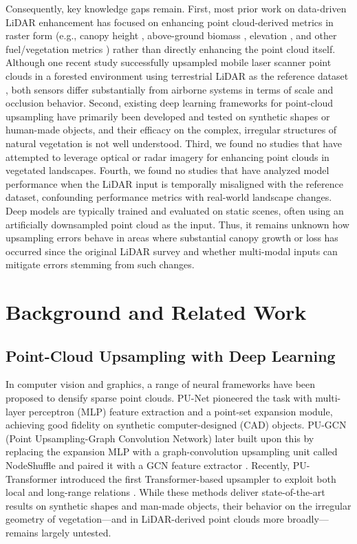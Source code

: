 \documentclass[12pt]{report}
\begin{document}
Consequently, key knowledge gaps remain. First, most prior work on data-driven LiDAR enhancement has focused on enhancing point cloud-derived metrics in raster form (e.g., canopy height \cite{wilkes_mapping_2015, wagner_sub-meter_2024}, above-ground biomass \cite{shendryk2022fusing}, elevation \cite{li2023large}, and other fuel/vegetation metrics \cite{taneja2023up, gazzea2023high}) rather than directly enhancing the point cloud itself. Although one recent study successfully upsampled mobile laser scanner point clouds in a forested environment using terrestrial LiDAR as the reference dataset \cite{remijnse2024upsampling}, both sensors differ substantially from airborne systems in terms of scale and occlusion behavior. Second, existing deep learning frameworks for point-cloud upsampling have primarily been developed and tested on synthetic shapes or human-made objects, and their efficacy on the complex, irregular structures of natural vegetation is not well understood. Third, we found no studies that have attempted to leverage optical or radar imagery for enhancing point clouds in vegetated landscapes. Fourth, we found no studies that have analyzed model performance when the LiDAR input is temporally misaligned with the reference dataset, confounding performance metrics with real-world landscape changes. Deep models are typically trained and evaluated on static scenes, often using an artificially downsampled point cloud as the input. Thus, it remains unknown how upsampling errors behave in areas where substantial canopy growth or loss has occurred since the original LiDAR survey and whether multi-modal inputs can mitigate errors stemming from such changes.

\section{Background and Related Work}

\subsection{Point-Cloud Upsampling with Deep Learning}

In computer vision and graphics, a range of neural frameworks have been proposed to densify sparse point clouds. PU-Net \cite{yu2018pu} pioneered the task with multi-layer perceptron (MLP) feature extraction and a point-set expansion module, achieving good fidelity on synthetic computer-designed (CAD) objects. PU-GCN (Point Upsampling-Graph Convolution Network) later built upon this by replacing the expansion MLP with a graph-convolution upsampling unit called NodeShuffle
and paired it with a GCN feature extractor \cite{qian2021pu}. Recently, PU-Transformer introduced the first Transformer-based upsampler to exploit both local and long-range relations \cite{qiu2022pu}. While these methods deliver state-of-the-art results on synthetic shapes and man-made objects, their behavior on the irregular geometry of vegetation—and in LiDAR-derived point clouds more broadly—remains largely untested.
\end{document}
